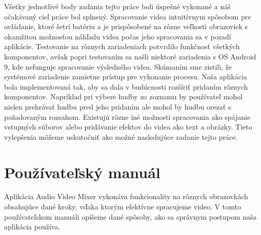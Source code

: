 \documentclass[12pt, oneside]{book}
\newcommand\listofappendices{\listofatoc}
\newcommand*\savedtocdepth{}
\edef\savedtocdepth{\the\value{tocdepth}}%
\let\originalappendix\appendix
\renewcommand\appendix{%
  \originalappendix
  \cleardoublepage
  \addcontentsline{toc}{chapter}{\appendixname}%
  \addtocontents{toc}{\protect\value{tocdepth}=-1}%
  \addtocontents{atoc}{\protect\value{tocdepth}=\savedtocdepth}%
}
\renewcommand{\appendixname}{Príloha}
\begin{document}
Všetky jednotlivé body zadania tejto práce boli úspešné vykonané a náš očakávaný cieľ práce bol splnený. Spracovanie videa intuitívnym spôsobom pre ovládanie, ktoré šetrí batériu a je prispôsobené na rôzne veľkosti obrazoviek s okamžitou možnosťou náhľadu videa počas jeho spracovania sa v pozadí aplikácie. Testovanie na rôznych zariadeniach potvrdilo funkčnosť všetkých komponentov, avšak popri testovaním sa našli niektoré zariadenia s OS Android 9, kde nefunguje spracovanie výsledného videa. Skúmaním sme zistili, že systémové zariadenie zamietne prístup pre vykonanie procesu.  Naša aplikácia bola implementovaná tak, aby sa dala v budúcnosti rozšíriť pridaním rôznych komponentov. Napríklad pri výbere hudby zo zoznamu by používateľ mohol nielen prehrávať hudbu pred jeho pridaním ale mohol by hudbu orezať s požadovaným rozsahom. Existujú rôzne iné možnosti spracovania ako spájanie vstupných súborov alebo pridávanie efektov do videa ako text a obrázky. Tieto vylepšenia môžeme uskutočniť ako možné nasledujúce zadanie tejto práce.


\newpage




\newpage

\makeatletter
{}

\listofappendices
\newpage
\appendix

\chapter{Používateľský manuál}

\hspace{15pt} Aplikácia Audio Video Mixer vykonáva funkcionality na rôznych obrazovkách obsahujúce dané kroky, vďaka ktorým efektívne spracujeme video. V tomto používateľskom manuáli opíšeme dané spôsoby, ako sa správnym postupom naša aplikácia používa.
\end{document}
